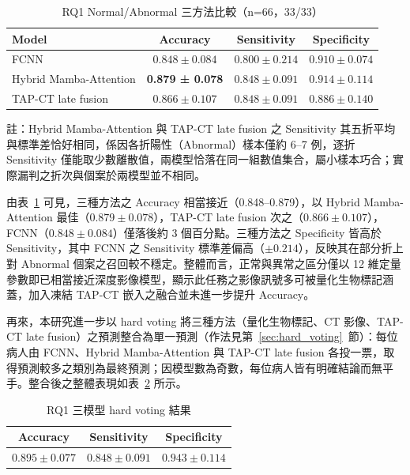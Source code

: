 \begin{ZhChapter}
\begin{table}[htbp]
\centering
\caption{RQ1 Normal/Abnormal 三方法比較（n=66，33/33）}
\label{tab:rq1_normal_abnormal}
\begingroup
\renewcommand{\arraystretch}{1.25}
\begin{tabularx}{0.95\textwidth}{>{\raggedright\arraybackslash}X c c c}
\hline
Model & Accuracy & Sensitivity & Specificity \\
\hline
FCNN & \(0.848 \pm 0.084\) & \(0.800 \pm 0.214\) & \(0.910 \pm 0.074\) \\
Hybrid Mamba-Attention & \textbf{0.879 ± 0.078} & \(0.848 \pm 0.091\) & \(0.914 \pm 0.114\) \\
TAP-CT late fusion & \(0.866 \pm 0.107\) & \(0.848 \pm 0.091\) & \(0.886 \pm 0.140\) \\
\hline
\end{tabularx}
\par\vspace{0.4em}
{\footnotesize 註：Hybrid Mamba-Attention 與 TAP-CT late fusion 之 Sensitivity 其五折平均與標準差恰好相同，係因各折陽性（Abnormal）樣本僅約 6--7 例，逐折 Sensitivity 僅能取少數離散值，兩模型恰落在同一組數值集合，屬小樣本巧合；實際漏判之折次與個案於兩模型並不相同。}
\endgroup
\end{table}

由表~\ref{tab:rq1_normal_abnormal} 可見，三種方法之 Accuracy 相當接近（0.848--0.879），以 Hybrid Mamba-Attention 最佳（\(0.879 \pm 0.078\)），TAP-CT late fusion 次之（\(0.866 \pm 0.107\)），FCNN（\(0.848 \pm 0.084\)）僅落後約 3 個百分點。三種方法之 Specificity 皆高於 Sensitivity，其中 FCNN 之 Sensitivity 標準差偏高（\(\pm 0.214\)），反映其在部分折上對 Abnormal 個案之召回較不穩定。整體而言，正常與異常之區分僅以 12 維定量參數即已相當接近深度影像模型，顯示此任務之影像訊號多可被量化生物標記涵蓋，加入凍結 TAP-CT 嵌入之融合並未進一步提升 Accuracy。

再來，本研究進一步以 hard voting 將三種方法（量化生物標記、CT 影像、TAP-CT late fusion）之預測整合為單一預測（作法見第~\ref{sec:hard_voting}~節）：每位病人由 FCNN、Hybrid Mamba-Attention 與 TAP-CT late fusion 各投一票，取得預測較多之類別為最終預測；因模型數為奇數，每位病人皆有明確結論而無平手。整合後之整體表現如表~\ref{tab:rq1_vote} 所示。

\begin{table}[htbp]
\centering
\caption{RQ1 三模型 hard voting 結果}
\label{tab:rq1_vote}
\begingroup
\renewcommand{\arraystretch}{1.25}
\begin{tabular}{ccc}
\hline
Accuracy & Sensitivity & Specificity \\
\hline
\(0.895 \pm 0.077\) & \(0.848 \pm 0.091\) & \(0.943 \pm 0.114\) \\
\hline
\end{tabular}
\endgroup
\end{table}


\end{ZhChapter}
